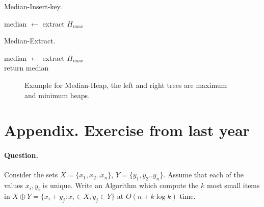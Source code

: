 \begin{algbox}{Median-Insert-key.}
\begin{algorithm}[H]

median $\leftarrow$ extract $H_{max}$  \\
\end{algorithm}
\end{algbox}

\begin{algbox}{Median-Extract.}
\begin{algorithm}[H]
median $\leftarrow$ extract $H_{max}$ \\   
return median 
\end{algorithm}
\end{algbox}

\begin{figure}[h]
  \centering
  \begin{subfigure}[b]{0.49\textwidth}
	
  \end{subfigure}
\begin{subfigure}[b]{0.49\textwidth}
	
  \end{subfigure}
  \caption{ Example for Median-Heap, the left and right trees are maximum and minimum heaps.  }
\end{figure}

\iffalse 
  \newpage

\section{ Appendix. Exercise from last year }

\paragraph{Question.} Consider the sets $X = \{x_1,x_2 .. x_n\}$, $Y = \{y_1, y_2 .. y_n\}$. Assume that each of the values $x_i,y_i$ is unique. Write an Algorithm which compute the $k$ most small items in $X \oplus Y = \{ x_{i} + y_{j} : x_{i} \in X , y_{j} \in Y  \} $ at $ O \left( n + k\log k  \right) $ time. 

